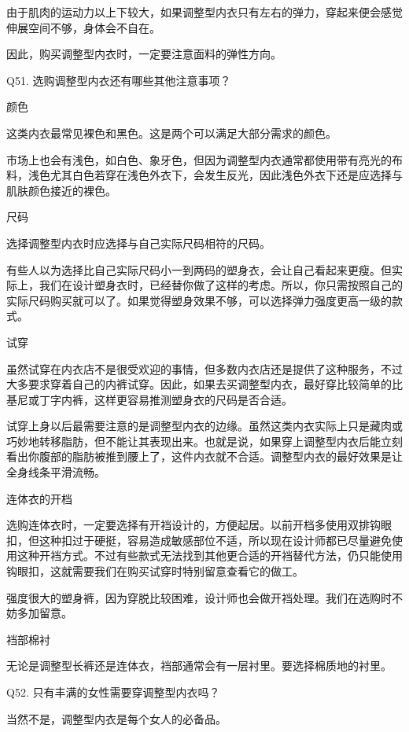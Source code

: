 \documentclass[12pt,UTF8]{ctexbook}
\begin{document}
由于肌肉的运动力以上下较大，如果调整型内衣只有左右的弹力，穿起来便会感觉伸展空间不够，身体会不自在。

因此，购买调整型内衣时，一定要注意面料的弹性方向。





Q51. 选购调整型内衣还有哪些其他注意事项？


颜色

这类内衣最常见裸色和黑色。这是两个可以满足大部分需求的颜色。

市场上也会有浅色，如白色、象牙色，但因为调整型内衣通常都使用带有亮光的布料，浅色尤其白色若穿在浅色外衣下，会发生反光，因此浅色外衣下还是应选择与肌肤颜色接近的裸色。

尺码

选择调整型内衣时应选择与自己实际尺码相符的尺码。

有些人以为选择比自己实际尺码小一到两码的塑身衣，会让自己看起来更瘦。但实际上，我们在设计塑身衣时，已经替你做了这样的考虑。所以，你只需按照自己的实际尺码购买就可以了。如果觉得塑身效果不够，可以选择弹力强度更高一级的款式。

试穿

虽然试穿在内衣店不是很受欢迎的事情，但多数内衣店还是提供了这种服务，不过大多要求穿着自己的内裤试穿。因此，如果去买调整型内衣，最好穿比较简单的比基尼或丁字内裤，这样更容易推测塑身衣的尺码是否合适。

试穿上身以后最需要注意的是调整型内衣的边缘。虽然这类内衣实际上只是藏肉或巧妙地转移脂肪，但不能让其表现出来。也就是说，如果穿上调整型内衣后能立刻看出你腹部的脂肪被推到腰上了，这件内衣就不合适。调整型内衣的最好效果是让全身线条平滑流畅。

连体衣的开档

选购连体衣时，一定要选择有开裆设计的，方便起居。以前开档多使用双排钩眼扣，但这种扣过于硬挺，容易造成敏感部位不适，所以现在设计师都已尽量避免使用这种开裆方式。不过有些款式无法找到其他更合适的开裆替代方法，仍只能使用钩眼扣，这就需要我们在购买试穿时特别留意查看它的做工。

强度很大的塑身裤，因为穿脱比较困难，设计师也会做开裆处理。我们在选购时不妨多加留意。

裆部棉衬

无论是调整型长裤还是连体衣，裆部通常会有一层衬里。要选择棉质地的衬里。





Q52. 只有丰满的女性需要穿调整型内衣吗？


当然不是，调整型内衣是每个女人的必备品。
\end{document}
